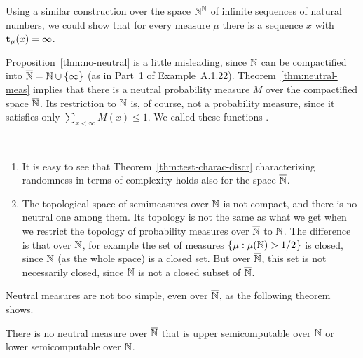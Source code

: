 Using a similar construction over the space \( \mathbb{N}^{\mathbb{N}} \) of infinite
sequences of natural numbers, we could show that 
for every measure \( \mu \) there is a sequence \( x \) with \( \mathbf{t}_{\mu}(x)=\infty \).

Proposition~\ref{thm:no-neutral} is a little misleading, since \( \mathbb{N} \) can be
compactified into \( \overline{\mathbb{N}} = \mathbb{N} \cup \{\infty\} \)
(as in Part~1 of Example~A.1.22).
Theorem~\ref{thm:neutral-meas} implies that there is a neutral probability
measure \( M \) over the compactified space \( \overline{\mathbb{N}} \).
Its restriction to \( \mathbb{N} \) is, of course, not a probability measure, since it
satisfies only \( \sum_{x < \infty} M(x) \le 1 \).
We called these functions .

 \begin{remark}\label{rem:compactify}\
 \begin{enumerate}

   \item
 It is easy to see that 
Theorem~\ref{thm:test-charac-discr} characterizing randomness in terms of
complexity holds also for the space \( \overline{\mathbb{N}} \).

   \item
The topological space of semimeasures
over \( \mathbb{N} \) is not compact, and there is no neutral one among them.
Its topology is not the same as what we get when we restrict the topology
of probability measures over \( \overline{\mathbb{N}} \) to \( \mathbb{N} \).
The difference is that over \( \mathbb{N} \), for example the set of measures
\( \mathopen\{\mskip 1mu\mu : \mu(\mathbb{N}) > 1/2\mskip 1mu\mathclose\} \) is closed, since \( \mathbb{N} \) (as the whole space)
is a closed set.
But over \( \overline{\mathbb{N}} \), this set is not necessarily closed, since
\( \mathbb{N} \) is not a closed subset of \( \overline{\mathbb{N}} \).
 \end{enumerate}
 \end{remark}

Neutral measures are not too simple, even over \( \overline{\mathbb{N}} \), as the following
theorem shows.

 \begin{theorem}\label{thm:no-upper-semi-neutral}
  \notready
There is no neutral measure over \( \overline{\mathbb{N}} \) that is upper
semicomputable over \( \mathbb{N} \) or lower semicomputable over \( \mathbb{N} \).
 \end{theorem}

